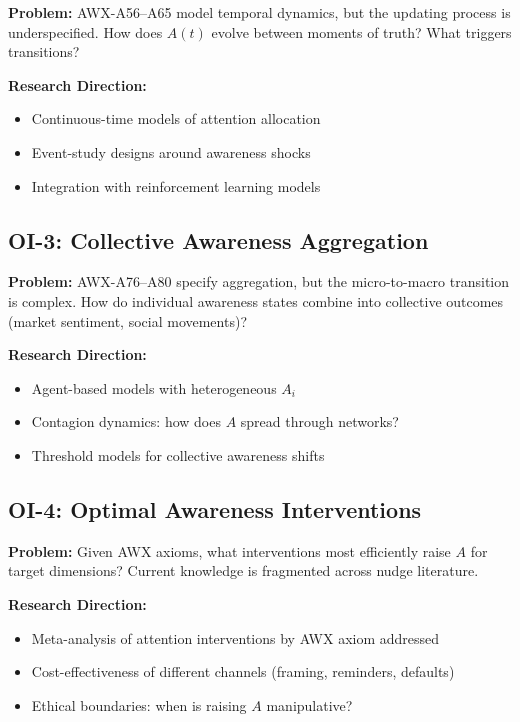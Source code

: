 \textbf{Problem:} AWX-A56--A65 model temporal dynamics, but the updating process is underspecified. How does $A(t)$ evolve between moments of truth? What triggers transitions?

\textbf{Research Direction:}
\begin{itemize}[nosep]
    \item Continuous-time models of attention allocation
    \item Event-study designs around awareness shocks
    \item Integration with reinforcement learning models
\end{itemize}

\subsection{OI-3: Collective Awareness Aggregation}

\textbf{Problem:} AWX-A76--A80 specify aggregation, but the micro-to-macro transition is complex. How do individual awareness states combine into collective outcomes (market sentiment, social movements)?

\textbf{Research Direction:}
\begin{itemize}[nosep]
    \item Agent-based models with heterogeneous $A_i$
    \item Contagion dynamics: how does $A$ spread through networks?
    \item Threshold models for collective awareness shifts
\end{itemize}

\subsection{OI-4: Optimal Awareness Interventions}

\textbf{Problem:} Given AWX axioms, what interventions most efficiently raise $A$ for target dimensions? Current knowledge is fragmented across nudge literature.

\textbf{Research Direction:}
\begin{itemize}[nosep]
    \item Meta-analysis of attention interventions by AWX axiom addressed
    \item Cost-effectiveness of different channels (framing, reminders, defaults)
    \item Ethical boundaries: when is raising $A$ manipulative?
\end{itemize}

